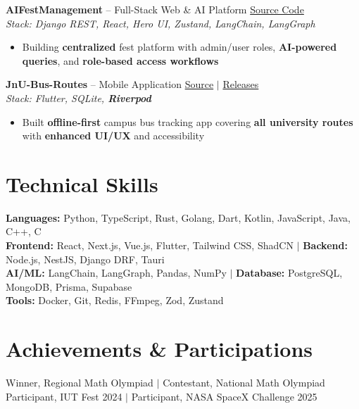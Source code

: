 \documentclass[10pt,a4paper]{article}
\begin{document}
\textbf{AIFestManagement} -- Full-Stack Web \& AI Platform \hfill \href{https://github.com/AhmedTrooper/AIFestManagement}{Source Code} \\
\textit{Stack: Django REST, React, Hero UI, Zustand, LangChain, LangGraph} \\[-6pt]
\begin{itemize}[leftmargin=12pt, itemsep=0pt, topsep=2pt]
    \item Building \textbf{centralized} fest platform with admin/user roles, \textbf{AI-powered queries}, and \textbf{role-based access workflows}
\end{itemize}

\textbf{JnU-Bus-Routes} -- Mobile Application \hfill \href{https://github.com/AhmedTrooper/JnU-Bus-Routes}{Source} $|$ \href{https://github.com/AhmedTrooper/JnU-Bus-Routes/releases}{Releases} \\
\textit{Stack: Flutter, SQLite, \textbf{Riverpod}} \\[-6pt]
\begin{itemize}[leftmargin=12pt, itemsep=0pt, topsep=2pt]
    \item Built \textbf{offline-first} campus bus tracking app covering \textbf{all university routes} with \textbf{enhanced UI/UX} and accessibility
\end{itemize}

\section{Technical Skills}
\textbf{Languages:} Python, TypeScript, Rust, Golang, Dart, Kotlin, JavaScript, Java, C++, C \\
\textbf{Frontend:} React, Next.js, Vue.js, Flutter, Tailwind CSS, ShadCN $|$ \textbf{Backend:} Node.js, NestJS, Django DRF, Tauri \\
\textbf{AI/ML:} LangChain, LangGraph, Pandas, NumPy $|$ \textbf{Database:} PostgreSQL, MongoDB, Prisma, Supabase \\
\textbf{Tools:} Docker, Git, Redis, FFmpeg, Zod, Zustand

\section{Achievements \& Participations}
Winner, Regional Math Olympiad $|$ Contestant, National Math Olympiad \\
Participant, IUT Fest 2024 $|$ Participant, NASA SpaceX Challenge 2025
\end{document}
